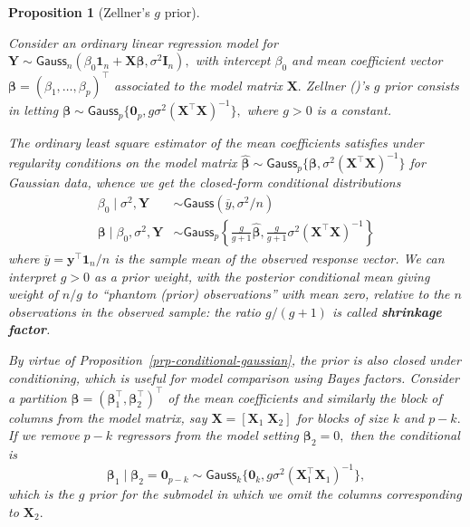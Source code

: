 \documentclass[
  11pt,
  letterpaper,
]{scrbook}
\theoremstyle{definition}
\theoremstyle{plain}
\newtheorem{proposition}{Proposition}[chapter]
\theoremstyle{plain}
\theoremstyle{plain}
\theoremstyle{definition}
\theoremstyle{definition}
\theoremstyle{plain}
\newtheorem{proposition}{Proposition}[chapter]
\theoremstyle{plain}
\theoremstyle{remark}
\begin{document}
\begin{proposition}[Zellner's \(g\)
prior]\protect\hypertarget{prp-Zellner-g-prior}{}\label{prp-Zellner-g-prior}

Consider an ordinary linear regression model for
\(\boldsymbol{Y} \sim \mathsf{Gauss}_n(\beta_0\mathbf{1}_n + \mathbf{X}\boldsymbol{\beta}, \sigma^2 \mathbf{I}_n),\)
with intercept \(\beta_0\) and mean coefficient vector
\(\boldsymbol{\beta} = (\beta_1, \ldots, \beta_p)^\top\) associated to
the model matrix \(\mathbf{X}.\) Zellner
()'s \(g\) prior consists in letting
\(\boldsymbol{\beta} \sim \mathsf{Gauss}_p\{\boldsymbol{0}_p, g \sigma^2(\mathbf{X}^\top\mathbf{X})^{-1}\},\)
where \(g>0\) is a constant.

The ordinary least square estimator of the mean coefficients satisfies
under regularity conditions on the model matrix
\(\widehat{\boldsymbol{\beta}} \sim \mathsf{Gauss}_p\{\boldsymbol{\beta}, \sigma^2(\mathbf{X}^\top\mathbf{X})^{-1}\}\)
for Gaussian data, whence we get the closed-form conditional
distributions \begin{align*}
\beta_0 \mid \sigma^2, \boldsymbol{Y} &\sim \mathsf{Gauss}(\overline{y}, \sigma^2/n)\\
\boldsymbol{\beta} \mid \beta_0, \sigma^2, \boldsymbol{Y} & \sim \mathsf{Gauss}_p\left\{\frac{g}{g+1} \widehat{\boldsymbol{\beta}}, \frac{g}{g+1}\sigma^2 (\mathbf{X}^\top\mathbf{X})^{-1}\right\} 
\end{align*} where \(\overline{y} = \boldsymbol{y}^\top\mathbf{1}_n/n\)
is the sample mean of the observed response vector. We can interpret
\(g>0\) as a prior weight, with the posterior conditional mean giving
weight of \(n/g\) to ``phantom (prior) observations'' with mean zero,
relative to the \(n\) observations in the observed sample: the ratio
\(g/(g+1)\) is called \textbf{shrinkage factor}.

By virtue of Proposition~\ref{prp-conditional-gaussian}, the prior is
also closed under conditioning, which is useful for model comparison
using Bayes factors. Consider a partition
\(\boldsymbol{\beta} = (\boldsymbol{\beta}_1^\top, \boldsymbol{\beta}_2^\top)^\top\)
of the mean coefficients and similarly the block of columns from the
model matrix, say \(\mathbf{X} = [\mathbf{X}_1\; \mathbf{X}_2]\) for
blocks of size \(k\) and \(p-k.\) If we remove \(p-k\) regressors from
the model setting \(\boldsymbol{\beta}_2=0,\) then the conditional is
\[\boldsymbol{\beta}_{1} \mid \boldsymbol{\beta}_2=\boldsymbol{0}_{p-k} \sim \mathsf{Gauss}_k\{\boldsymbol{0}_k, g\sigma^2 (\mathbf{X}_1^\top\mathbf{X}_1)^{-1}\},\]
which is the \(g\) prior for the submodel in which we omit the columns
corresponding to \(\mathbf{X}_2.\)

\end{proposition}
\end{document}
